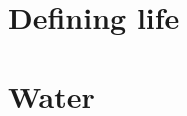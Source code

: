 \documentclass[DIV=calc, paper=a4, fontsize=12pt]{scrartcl}	 %
\begin{document}
\begin{multicols}{2}



\end{multicols}

\noindent\makebox[\linewidth]{\rule{\textwidth}{0.4pt}}


\section{Defining life}

\begin{multicols}{2}



\end{multicols}


\pagebreak

\section{Water}

\begin{multicols}{2}



\end{multicols}

\noindent\makebox[\linewidth]{\rule{\textwidth}{0.4pt}}






%

\end{document}

